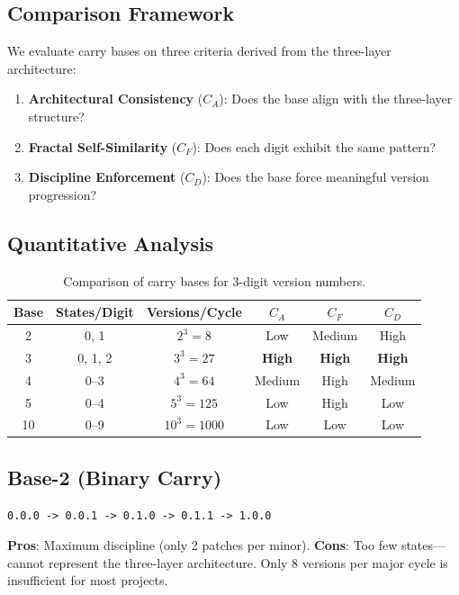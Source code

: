 \documentclass{article}
\begin{document}
\subsection{Comparison Framework}

We evaluate carry bases on three criteria derived from the three-layer architecture:

\begin{enumerate}
\item \textbf{Architectural Consistency} ($C_A$): Does the base align with the three-layer structure?
\item \textbf{Fractal Self-Similarity} ($C_F$): Does each digit exhibit the same pattern?
\item \textbf{Discipline Enforcement} ($C_D$): Does the base force meaningful version progression?
\end{enumerate}

\subsection{Quantitative Analysis}

\begin{table}[h]
\centering
\caption{Comparison of carry bases for 3-digit version numbers.}
\label{tab:base-comparison}
\begin{tabular}{cccccc}
\toprule
\textbf{Base} & \textbf{States/Digit} & \textbf{Versions/Cycle} & $C_A$ & $C_F$ & $C_D$ \\
\midrule
2 & 0, 1 & $2^3 = 8$ & Low & Medium & High \\
3 & 0, 1, 2 & $3^3 = 27$ & \textbf{High} & \textbf{High} & \textbf{High} \\
4 & 0--3 & $4^3 = 64$ & Medium & High & Medium \\
5 & 0--4 & $5^3 = 125$ & Low & High & Low \\
10 & 0--9 & $10^3 = 1000$ & Low & Low & Low \\
\bottomrule
\end{tabular}
\end{table}

\subsection{Base-2 (Binary Carry)}

\begin{verbatim}
0.0.0 -> 0.0.1 -> 0.1.0 -> 0.1.1 -> 1.0.0
\end{verbatim}

\textbf{Pros}: Maximum discipline (only 2 patches per minor).
\textbf{Cons}: Too few states---cannot represent the three-layer architecture. Only 8 versions per major cycle is insufficient for most projects.
\end{document}
